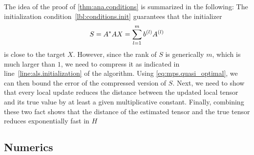 The idea of the proof of \cref{thm:ana.conditions} is summarized in the following:
The initialization condition~\ref{lbl:conditions.init} guarantees that the initializer
\[
  S = {{A}^\ast}A X = \sum_{l=1}^m b^{(l)} A^{(l)}
\]
is close to the target $X$.
However, since the rank of $S$ is generically $m$, which is much larger than $1$, we need to compress it as indicated in line~\ref{line:als.initialization} of the algorithm.
Using \cref{eq:mps.quasi_optimal}, we can then bound the error of the compressed version of $S$.
Next, we need to show that every local update reduces the distance between the updated local tensor and its true value by at least a given multiplicative constant.
Finally, combining these two fact shows that the distance of the estimated tensor and the true tensor reduces exponentially fast in $H$\\




\subsection{Numerics}%

